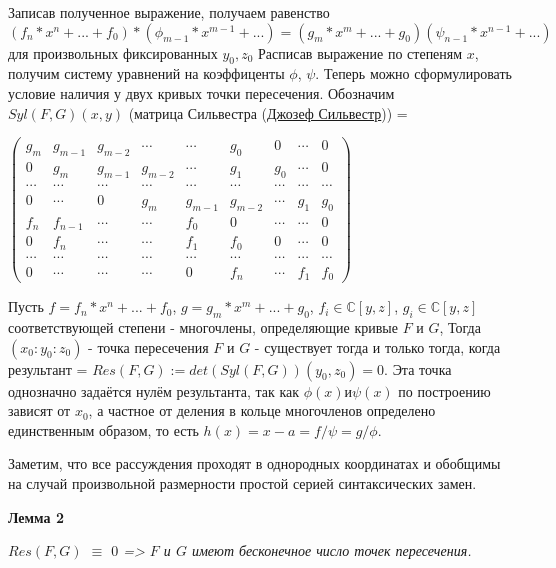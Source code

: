 \documentclass[a4paper, 12pt]{article}
\begin{document}
Записав полученное выражение, получаем равенство $(f_n*x^n + ... + f_0)*(\phi_{m-1}*x^{m-1} + ...) = (g_m*x^m + ... + g_0)(\psi_{n-1}*x^{n-1} + ...)$ для произвольных фиксированных $y_0, z_0$
Расписав выражение по степеням $x$, получим систему уравнений на коэффиценты $\phi$, $\psi$.
Теперь можно сформулировать условие наличия у двух кривых точки пересечения.
\smallskip
Обозначим $Syl(F,G)(x,y)$ (матрица Сильвестра (\href{https://ru.wikipedia.org/wiki/%D0%A1%D0%B8%D0%BB%D1%8C%D0%B2%D0%B5%D1%81%D1%82%D1%80,_%D0%94%D0%B6%D0%B5%D0%B9%D0%BC%D1%81_%D0%94%D0%B6%D0%BE%D0%B7%D0%B5%D1%84}{Джозеф Сильвестр})) =

\smallskip
$\begin{pmatrix}
g_m & g_{m-1} & g_{m-2} & \cdots & \cdots & g_0 & 0 & \cdots & 0 \\
0 & g_m & g_{m-1} & g_{m-2} & \cdots & g_1 & g_0 & \cdots & 0 \\
\cdots & \cdots & \cdots & \cdots & \cdots & \cdots & \cdots & \cdots & \cdots \\
0 & \cdots & 0 & g_m & g_{m-1} & g_{m-2} & \cdots & g_1 & g_0 \\
f_n & f_{n-1} & \cdots & \cdots & f_0 & 0 & \cdots & \cdots & 0 \\
0 & f_n & \cdots & \cdots & f_1 & f_0 & 0 & \cdots & 0 \\
\cdots & \cdots & \cdots & \cdots & \cdots & \cdots & \cdots & \cdots & \cdots \\
0 & \cdots & \cdots & \cdots & 0 & f_n & \cdots & f_1 & f_0
\end{pmatrix}$
\bigskip

Пусть $f=f_n*x^n + ... + f_0$, $g=g_m*x^m + ... + g_0$, $f_i \in \mathbb{C}[y,z]$, $g_i \in \mathbb{C}[y,z]$ соответствующей степени - многочлены, определяющие кривые $F$ и $G$,\newline
Тогда $(x_0:y_0:z_0)$ - точка пересечения $F$ и $G$ - существует тогда и только тогда, когда результант = $Res(F,G) := det(Syl(F,G))(y_0,z_0) = 0$. Эта точка однозначно задаётся нулём результанта, так как $\phi(x) и \psi(x)$ по построению зависят от $x_0$, а частное от деления в кольце многочленов определено единственным образом, то есть $h(x)=x-a=f/\psi=g/\phi$.

Заметим, что все рассуждения проходят в однородных координатах и обобщимы на случай произвольной размерности простой серией синтаксических замен.

\textbf{Лемма 2}

\textit{$Res(F,G)$ $\equiv$ $0$ => $F$ и $G$ имеют бесконечное число точек пересечения.}
\end{document}
